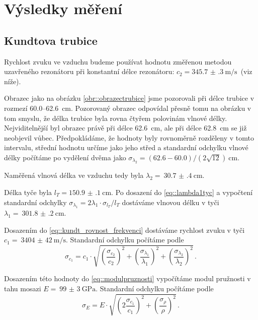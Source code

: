 \section*{Výsledky měření}
\subsection*{Kundtova trubice}
Rychlost zvuku ve vzduchu budeme používat hodnotu změřenou metodou uzavřeného rezonátoru při konstantní délce rezonátoru: $c_2 = \SI{345.7(3)}{\m\per\s}$~(viz níže).

Obrazec jako na obrázku \ref{obr::obrazectrubice} jsme pozorovali při délce trubice v rozmezí \num{60.0}--\SI{62.6}{\cm}.
Pozorovaný obrazec odpovídal přesně tomu na obrázku v tom smyslu, že délka trubice byla rovna čtyřem polovinám vlnové délky. 
Nejviditelnější byl obrazec právě při délce \SI{62.6}{\cm}, ale při délce \SI{62.8}{\cm} se již neobjevil vůbec.
Předpokládáme, že hodnoty byly rovnoměrně rozděleny v tomto intervalu, střední hodnotu určíme jako jeho střed a standardní odchylku vlnové délky počítáme po vydělení dvěma jako \mbox{$\sigma_{\lambda_2} = (\num{62.6}-\num{60.0})/(2\sqrt{12})~\si{\cm}$}.

Naměřená vlnová délka ve vzduchu tedy byla $\lambda_2 =~\SI{30.7(4)}{\cm}$.

Délka tyče byla $l_T = \SI{150.9(1)}{\cm}$.
Po dosazení do \eqref{eq::lambda1tyc} a vypočtení standardní odchylky $\sigma_{\lambda_1}=2 \lambda_1 \cdot \sigma_{l_T} / l_T$ dostáváme vlnovou délku v tyči $\lambda_1 =~\SI{301.8(2)}{\cm}$.

Dosazením do \eqref{eq::kundt_rovnost_frekvenci} dostáváme rychlost zvuku v tyči $c_1 =~\SI{3404(42)}{\m\per\s}$.
Standardní odchylku počítáme podle
\begin{equation}
\sigma _{c_1} = c_1 \cdot \sqrt{  \left( \frac{\sigma _{c_2}}{c_2}  \right)^2   +    \left( \frac{\sigma _{\lambda_1}}{\lambda_1}  \right)^2     +    \left( \frac{\sigma _{\lambda_2}}{\lambda_2}  \right)^2  } \,.
\end{equation}

Dosazením této hodnoty do \eqref{eq::modulpruznosti} vypočítáme modul pružnosti v tahu mosazi $E=~\SI{99(3)}{\GPa}$. 
Standardní odchylku počítáme podle
\begin{equation}
\sigma _E = E \cdot \sqrt{ \left( 2 \frac{\sigma _{c_1}}{c_1} \right)^2 +   \left( \frac{\sigma_\rho}{\rho}\right)^2} \,.
\end{equation}






